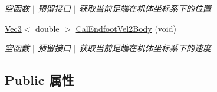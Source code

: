 \begin{DoxyCompactItemize}
\begin{DoxyCompactList}\small\item\em 空函数 $\vert$ 预留接口 $\vert$ 获取当前足端在机体坐标系下的位置 \end{DoxyCompactList}\item 
\hyperlink{cppTypes_8h_a65c27bf97693676535dd0b30ea0ad399}{Vec3}$<$ double $>$ \hyperlink{classquadruped_1_1RobotModel_a1e5c0b934e4e3d5a1914f5a965f13acc}{Cal\+Endfoot\+Vel2\+Body} (void)
\begin{DoxyCompactList}\small\item\em 空函数 $\vert$ 预留接口 $\vert$ 获取当前足端在机体坐标系下的速度 \end{DoxyCompactList}\end{DoxyCompactItemize}
\subsection*{Public 属性}
